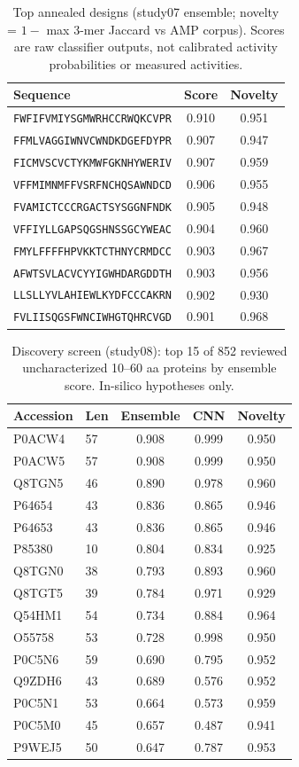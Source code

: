 \begin{table}[h]\centering\caption{Top annealed designs (study07 ensemble; novelty = $1 - $ max 3-mer Jaccard vs AMP corpus). Scores are raw classifier outputs, not calibrated activity probabilities or measured activities.}\label{tab:designs}
\begin{tabular}{lcc}\hline Sequence & Score & Novelty \\ \hline
\texttt{FWFIFVMIYSGMWRHCCRWQKCVPR} & 0.910 & 0.951 \\
\texttt{FFMLVAGGIWNVCWNDKDGEFDYPR} & 0.907 & 0.947 \\
\texttt{FICMVSCVCTYKMWFGKNHYWERIV} & 0.907 & 0.959 \\
\texttt{VFFMIMNMFFVSRFNCHQSAWNDCD} & 0.906 & 0.955 \\
\texttt{FVAMICTCCCRGACTSYSGGNFNDK} & 0.905 & 0.948 \\
\texttt{VFFIYLLGAPSQGSHNSSGCYWEAC} & 0.904 & 0.960 \\
\texttt{FMYLFFFFHPVKKTCTHNYCRMDCC} & 0.903 & 0.967 \\
\texttt{AFWTSVLACVCYYIGWHDARGDDTH} & 0.903 & 0.956 \\
\texttt{LLSLLYVLAHIEWLKYDFCCCAKRN} & 0.902 & 0.930 \\
\texttt{FVLIISQGSFWNCIWHGTQHRCVGD} & 0.901 & 0.968 \\
\hline\end{tabular}\end{table}
\begin{table}[h]\centering\caption{Discovery screen (study08): top 15 of 852 reviewed uncharacterized 10--60 aa proteins by ensemble score. In-silico hypotheses only.}\label{tab:screen}
\begin{tabular}{llccc}\hline Accession & Len & Ensemble & CNN & Novelty \\ \hline
P0ACW4 & 57 & 0.908 & 0.999 & 0.950 \\
P0ACW5 & 57 & 0.908 & 0.999 & 0.950 \\
Q8TGN5 & 46 & 0.890 & 0.978 & 0.960 \\
P64654 & 43 & 0.836 & 0.865 & 0.946 \\
P64653 & 43 & 0.836 & 0.865 & 0.946 \\
P85380 & 10 & 0.804 & 0.834 & 0.925 \\
Q8TGN0 & 38 & 0.793 & 0.893 & 0.960 \\
Q8TGT5 & 39 & 0.784 & 0.971 & 0.929 \\
Q54HM1 & 54 & 0.734 & 0.884 & 0.964 \\
O55758 & 53 & 0.728 & 0.998 & 0.950 \\
P0C5N6 & 59 & 0.690 & 0.795 & 0.952 \\
Q9ZDH6 & 43 & 0.689 & 0.576 & 0.952 \\
P0C5N1 & 53 & 0.664 & 0.573 & 0.959 \\
P0C5M0 & 45 & 0.657 & 0.487 & 0.941 \\
P9WEJ5 & 50 & 0.647 & 0.787 & 0.953 \\
\hline\end{tabular}\end{table}
